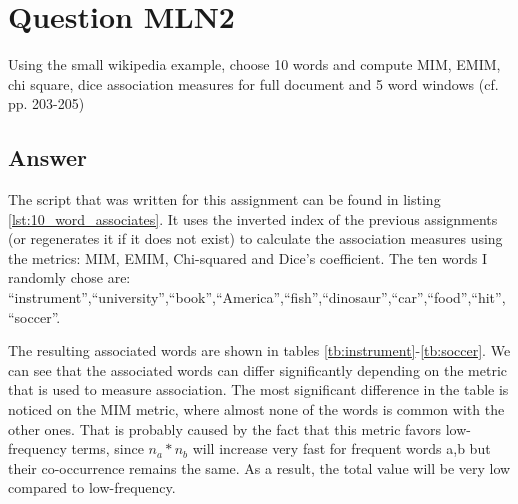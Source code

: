 \documentclass{article}
\begin{document}
	\section*{Question MLN2}
	 Using the small wikipedia example, choose 10 words and compute MIM, EMIM, chi square, dice association measures for full document and 5 word windows (cf. pp. 203-205)
	\subsection*{Answer}
	The script that was written for this assignment can be found in listing \ref{lst:10_word_associates}. It uses the inverted index of the previous assignments (or regenerates it if it does not exist) to calculate the association measures using the metrics: MIM, EMIM, Chi-squared and Dice's coefficient. The ten words I randomly chose are:
	\textquotedblleft instrument\textquotedblright,\textquotedblleft university\textquotedblright,\textquotedblleft book\textquotedblright,\textquotedblleft America\textquotedblright,\textquotedblleft fish\textquotedblright,\textquotedblleft dinosaur\textquotedblright,\textquotedblleft car\textquotedblright,\textquotedblleft food\textquotedblright,\textquotedblleft hit\textquotedblright,\textquotedblleft soccer\textquotedblright.
	
	The resulting associated words are shown in tables \ref{tb:instrument}-\ref{tb:soccer}.	We can see that the associated words can differ significantly depending on the metric that is used to measure association. The most significant difference in the table is noticed on the MIM metric, where almost none of the words is common with the other ones. That is probably caused by the fact that this metric favors low-frequency terms, since $n_a*n_b$ will increase very fast for frequent words a,b but their co-occurrence remains the same. As a result, the total value will be very low compared to low-frequency.
\end{document}
